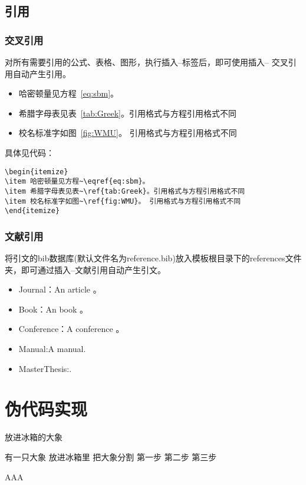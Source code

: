 \subsection{引用}
\subsubsection{交叉引用}
对所有需要引用的公式、表格、图形，执行插入--标签后，即可使用插入-- 交叉引用自动产生引用。
\begin{itemize}
    \item 哈密顿量见方程~\eqref{eq:sbm}。
    \item 希腊字母表见表~\ref{tab:Greek}。引用格式与方程引用格式不同
    \item 校名标准字如图~\ref{fig:WMU}。 引用格式与方程引用格式不同
\end{itemize}
具体见代码：
\begin{verbatim}
\begin{itemize}
\item 哈密顿量见方程~\eqref{eq:sbm}。
\item 希腊字母表见表~\ref{tab:Greek}。引用格式与方程引用格式不同
\item 校名标准字如图~\ref{fig:WMU}。 引用格式与方程引用格式不同
\end{itemize}
\end{verbatim}

\subsubsection{文献引用}
将引文的bib数据库(默认文件名为reference.bib)放入模板根目录下的references文件夹，即可通过插入--文献引用自动产生引文。
\begin{itemize}
    \item Journal：An article 。
    \item Book：An book \cite{IEEE-1363,tex,companion}。
    \item Conference：A conference \cite{kocher99,DPMG,cnproceed}。
    \item Manual:A manual\cite{NPB2}.
    \item MasterThesis:\cite{zhubajie,metamori2004,shaheshang,FistSystem01}.
\end{itemize}
\section{伪代码实现}
\begin{algorithm}
    \caption{放进冰箱的大象}\label{算法实例}
    \begin{algorithmic}
        \REQUIRE 有一只大象
        \ENSURE 放进冰箱里
        \STATE 把大象分割
        \ENDIF
        \ENDFOR
        \STATE 第一步
        \STATE 第二步
        \STATE 第三步
    \end{algorithmic}
    AAA\end{algorithm}
